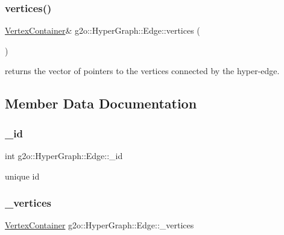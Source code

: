 \subsubsection{\texorpdfstring{vertices()}{vertices()}\hspace{0.1cm}{\footnotesize\ttfamily [2/2]}}
{\footnotesize\ttfamily \mbox{\hyperlink{classg2o_1_1_hyper_graph_a9339534c99300a0ddac87ba976ef188c}{Vertex\+Container}}\& g2o\+::\+Hyper\+Graph\+::\+Edge\+::vertices (\begin{DoxyParamCaption}{ }\end{DoxyParamCaption})\hspace{0.3cm}{\ttfamily [inline]}}

returns the vector of pointers to the vertices connected by the hyper-\/edge. 

\subsection{Member Data Documentation}
\mbox{\label{classg2o_1_1_hyper_graph_1_1_edge_aa1b6978624f7c165a4e0461cb5ff18fa}} 
\subsubsection{\texorpdfstring{\+\_\+id}{\_id}}
{\footnotesize\ttfamily int g2o\+::\+Hyper\+Graph\+::\+Edge\+::\+\_\+id\hspace{0.3cm}{\ttfamily [protected]}}



unique id 

\mbox{\label{classg2o_1_1_hyper_graph_1_1_edge_aabb036d331fc7f2524ec8611b638de92}} 
\subsubsection{\texorpdfstring{\+\_\+vertices}{\_vertices}}
{\footnotesize\ttfamily \mbox{\hyperlink{classg2o_1_1_hyper_graph_a9339534c99300a0ddac87ba976ef188c}{Vertex\+Container}} g2o\+::\+Hyper\+Graph\+::\+Edge\+::\+\_\+vertices\hspace{0.3cm}{\ttfamily [protected]}}



